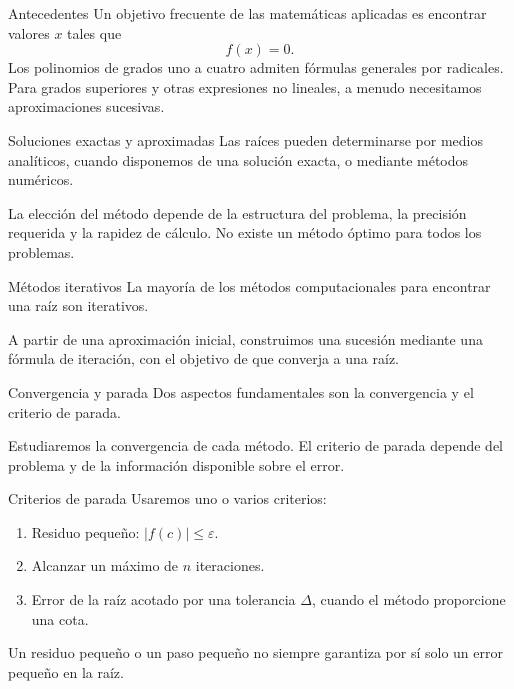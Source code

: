 \documentclass[main.tex]{subfiles}
\begin{document}
\graphicspath{{imagenes/tema7/}{../imagenes/tema7/}}



\begin{frame}{Antecedentes}
Un objetivo frecuente de las matemáticas aplicadas es encontrar valores $x$ tales que\[f(x)=0.\]Los polinomios de grados uno a cuatro admiten fórmulas generales por radicales. Para grados superiores y otras expresiones no lineales, a menudo necesitamos aproximaciones sucesivas.
\end{frame}

\begin{frame}{Soluciones exactas y aproximadas}
Las raíces pueden determinarse por medios analíticos, cuando disponemos de una solución exacta, o mediante métodos numéricos.\par\medskip La elección del método depende de la estructura del problema, la precisión requerida y la rapidez de cálculo. No existe un método óptimo para todos los problemas.
\end{frame}

\begin{frame}{Métodos iterativos}
La mayoría de los métodos computacionales para encontrar una raíz son iterativos.\par\medskip A partir de una aproximación inicial, construimos una sucesión mediante una fórmula de iteración, con el objetivo de que converja a una raíz.
\end{frame}

\begin{frame}{Convergencia y parada}
Dos aspectos fundamentales son la convergencia y el criterio de parada.\par\medskip Estudiaremos la convergencia de cada método. El criterio de parada depende del problema y de la información disponible sobre el error.
\end{frame}

\begin{frame}{Criterios de parada}
Usaremos uno o varios criterios:\begin{enumerate}\item Residuo pequeño: $|f(c)|\le\varepsilon$.\item Alcanzar un máximo de $n$ iteraciones.\item Error de la raíz acotado por una tolerancia $\Delta$, cuando el método proporcione una cota.\end{enumerate}Un residuo pequeño o un paso pequeño no siempre garantiza por sí solo un error pequeño en la raíz.
\end{frame}
\end{document}

